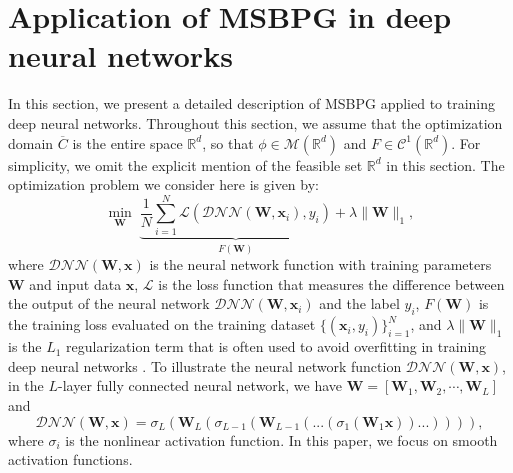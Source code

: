 \documentclass[twoside,11pt]{article}
\newcommand{\be}{\begin{equation}}
\newcommand{\ee}{\end{equation}}
\newcommand{\R}{\mathbb R}
\newcommand{\cC}{\mathcal C}
\newcommand{\cL}{\mathcal L}
\newcommand{\cM}{\mathcal M}
\def\vx{{\bm{x}}}
\def\mW{{\bm{W}}}
\begin{document}
\section{Application of MSBPG in deep neural networks}\label{DNN implementation}
In this section, we present a detailed description of MSBPG applied to training deep neural networks. Throughout this section, we assume that the optimization domain $\overline{C}$ is the entire space $\R^d$, so that $\phi\in\cM(\R^d)$ and $F\in\cC^1(\R^d)$. For simplicity, we omit the explicit mention of the feasible set $\R^d$ in this section. The optimization problem we consider here is given by:
\be 
\min_{\mW}\;\underbrace{\frac{1}{N}\sum_{i=1}^N\cL(\mathcal{DNN}(\mW,\vx_i),y_i)}_{F(\mW)}+\lambda\|\mW\|_1,
\label{DNN-loss-model}
\ee 
where $\mathcal{DNN}({\mW},\vx)$ is the neural network function with training parameters $\mW$ and input data $\vx$, $\mathcal{L}$ is the loss function that measures the difference between the output of the neural network $\mathcal{DNN}({\mW},\vx_i)$ and the label $y_i$, $F(\mW)$ is the training loss evaluated on the training dataset $\{(\vx_i,y_i)\}_{i=1}^N$, and $\lambda \|\mW\|_1$ is the $L_1$ regularization term that is often used to avoid overfitting in training deep neural networks \citep{ng2004feature}. To illustrate the neural network function $\mathcal{DNN}({\mW},\vx)$, in the $L$-layer fully connected neural network, we have $\mW=[\mW_1,\mW_2,\cdots,\mW_L]$ and
\begin{equation}
\mathcal{DNN}(\mW,\vx)=\sigma_L(\mW_L(\sigma_{L-1}(\mW_{L-1}(...(\sigma_1(\mW_1\vx))...)))),
\label{DNN-def}
\end{equation}
where $\sigma_i$ is the nonlinear activation function. In this paper, we focus on smooth activation functions.
\end{document}
